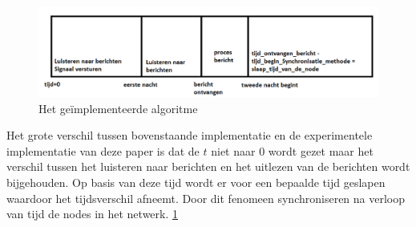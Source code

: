 \documentclass{article}
\begin{document}
\begin{figure}[h]
\centering\includegraphics[scale=0.5]{Onze_implementatie}
\caption{Het ge\"{i}mplementeerde algoritme}
\label{fig: Onze_implementatie}
\end{figure}
Het grote verschil tussen bovenstaande implementatie en de experimentele implementatie van deze paper is dat de $t$ niet naar $0$ wordt gezet maar het verschil tussen het luisteren naar berichten en het uitlezen van de berichten wordt bijgehouden. Op basis van deze tijd wordt er voor een bepaalde tijd geslapen waardoor het tijdsverschil afneemt. Door dit fenomeen synchroniseren na verloop van tijd de nodes in het netwerk. 
\ref{fig: Onze_implementatie}
\end{document}

